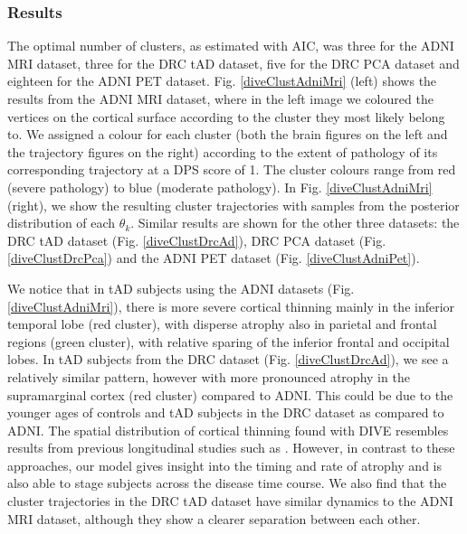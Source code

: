 \subsubsection{Results}

The optimal number of clusters, as estimated with AIC, was three for the ADNI MRI dataset, three for the DRC tAD dataset, five for the DRC PCA dataset and eighteen for the ADNI PET dataset. Fig. \ref{diveClustAdniMri} (left) shows the results from the ADNI MRI dataset, where in the left image we coloured the vertices on the cortical surface according to the cluster they most likely belong to. We assigned a colour for each cluster (both the brain figures on the left and the trajectory figures on the right) according to the extent of pathology of its corresponding trajectory at a DPS score of 1. The cluster colours range from red (severe pathology) to blue (moderate pathology). In Fig. \ref{diveClustAdniMri} (right), we show the resulting cluster trajectories with samples from the posterior distribution of each $\theta_k$. Similar results are shown for the other three datasets: the DRC tAD dataset (Fig. \ref{diveClustDrcAd}), DRC PCA dataset (Fig. \ref{diveClustDrcPca}) and the ADNI PET dataset (Fig. \ref{diveClustAdniPet}).


We notice that in tAD subjects using the ADNI datasets (Fig. \ref{diveClustAdniMri}), there is more severe cortical thinning mainly in the inferior temporal lobe (red cluster), with disperse atrophy also in parietal and frontal regions (green cluster), with relative sparing of the inferior frontal and occipital lobes. In tAD subjects from the DRC dataset (Fig. \ref{diveClustDrcAd}), we see a relatively similar pattern, however with more pronounced atrophy in the supramarginal cortex (red cluster) compared to ADNI. This could be due to the younger ages of controls and tAD subjects in the DRC dataset as compared to ADNI. The spatial distribution of cortical thinning found with DIVE resembles results from previous longitudinal studies such as \cite{dickerson2008cortical,singh2006spatial}. However, in contrast to these approaches, our model gives insight into the timing and rate of atrophy and is also able to stage subjects across the disease time course. We also find that the cluster trajectories in the DRC tAD dataset have similar dynamics to the ADNI MRI dataset, although they show a clearer separation between each other.

